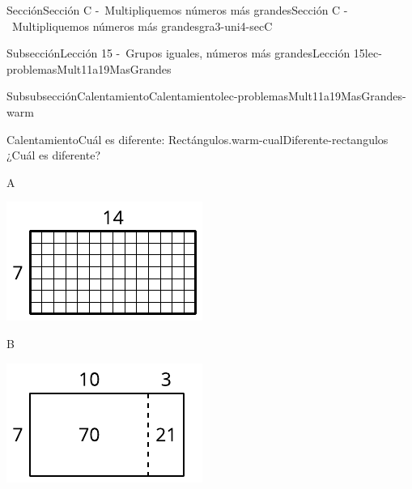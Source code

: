 \documentclass[twoside,10pt,]{article}
\begin{document}
\begin{sectionptx}{Sección}{Sección C -~Multipliquemos números más grandes}{}{Sección C -~Multipliquemos números más grandes}{}{}{gra3-uni4-secC}
\begin{subsectionptx}{Subsección}{Lección 15 -~Grupos iguales, números más grandes}{}{Lección 15}{}{}{lec-problemasMult11a19MasGrandes}
\typeout{************************************************}
%
\begin{subsubsectionptx}{Subsubsección}{Calentamiento}{}{Calentamiento}{}{}{lec-problemasMult11a19MasGrandes-warm}
\begin{exploration}{Calentamiento}{Cuál es diferente: Rectángulos.}{warm-cualDiferente-rectangulos}%
¿Cuál es diferente?%
\begin{sidebyside}{2}{0}{0}{0}%
\begin{sbspanel}{0.5}%
A%
\par
\includegraphics[width=\linewidth]{external/svg-source/tikz-file-149350-scale13.pdf}
\end{sbspanel}%
\begin{sbspanel}{0.5}%
B%
\par
\includegraphics[width=\linewidth]{external/svg-source/tikz-file-149351-scale13.pdf}
\end{sbspanel}%
\end{sidebyside}%
\begin{sidebyside}{2}{0}{0}{0}%

\end{sidebyside}
\end{exploration}
\end{subsubsectionptx}
\end{subsectionptx}
\end{sectionptx}
\end{document}
